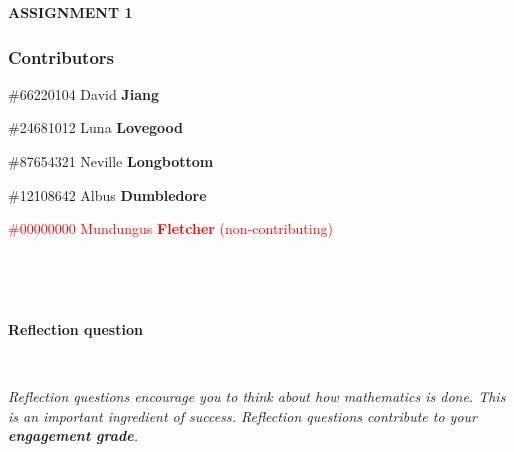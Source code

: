 \documentclass{exam}
\begin{document}
\large{\textbf{ASSIGNMENT 1}}

\normalsize




\subsubsection*{Contributors}


\begin{itemize}
    \item \#66220104 David {\bf Jiang} 
    \item \#24681012 Luna {\bf Lovegood}
    \item \#87654321 Neville {\bf Longbottom}
    \item \#12108642 Albus {\bf Dumbledore}
    \textcolor{red}{\item \#00000000 Mundungus {\bf Fletcher}  (non-contributing)}
\end{itemize}

\

\hrulefill

\

\textbf{Reflection question}

\

\textit{Reflection questions encourage you to think about how mathematics is done. This is an important ingredient of success. Reflection questions contribute to your \textbf{engagement grade}.}
\end{document}
